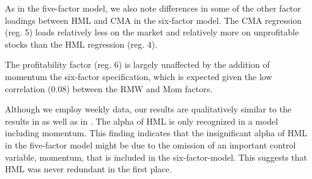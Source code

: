 As in the five-factor model, we also note differences in some of the other factor loadings between HML and CMA in the six-factor model. The CMA regression (reg. 5) loads relatively less on the market and relatively more on unprofitable stocks than the HML regression (reg. 4). 

The profitability factor (reg. 6) is largely unaffected by the addition of momentum the six-factor specification, which is expected given the low correlation (0.08) between the RMW and Mom factors. 

Although we employ weekly data, our results are qualitatively similar to the results in \textcite{FF2015} as well as in \textcite{Asness2015}. The alpha of HML is only recognized in a model including momentum. This finding indicates that the insignificant alpha of HML in the five-factor model might be due to the omission of an important control variable, momentum, that is included in the six-factor-model. This suggests that HML was never redundant in the first place.



